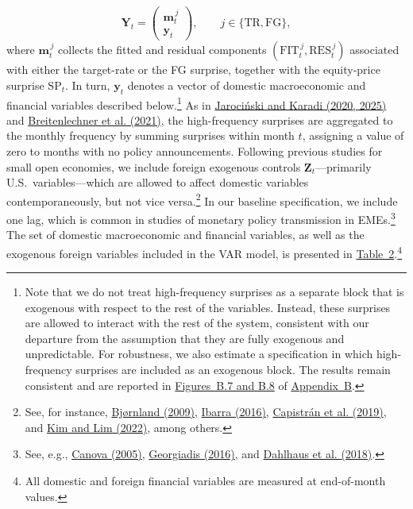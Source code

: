 \documentclass[12pt, reqno]{article}
\begin{document}
\[
\boldsymbol{Y}_t =
\begin{pmatrix}
\boldsymbol{m}_t^{\,j} \\
\boldsymbol{y}_t
\end{pmatrix},
\qquad j \in \{\text{TR}, \text{FG}\},
\]
where $\boldsymbol{m}_t^{\,j}$ collects the fitted and residual components $(\text{FIT}_t^{\,j}, \text{RES}_t^{\,j})$ associated with either the target-rate or the FG surprise, together with the equity-price surprise $\text{SP}_t$. In turn, $\boldsymbol{y}_t$ denotes a vector of domestic macroeconomic and financial variables described below.\footnote{Note that we do not treat high-frequency surprises as a separate block that is exogenous with respect to the rest of the variables. Instead, these surprises are allowed to interact with the rest of the system, consistent with our departure from the assumption that they are fully exogenous and unpredictable. For robustness, we also estimate a specification in which high-frequency surprises are included as an exogenous block. The results remain consistent and are reported in \hyperlink{Figure B.7}{Figures~B.7 and B.8} of \hyperlink{Appendix B}{Appendix~B}.} As in \hyperlink{JK (2020)}{Jarociński and Karadi (2020, 2025)} and \hyperlink{Breitenlechner (2021)}{Breitenlechner et al. (2021)}, the high-frequency surprises are aggregated to the monthly frequency by summing surprises within month $t$, assigning a value of zero to months with no policy announcements. Following previous studies for small open economies, we include foreign exogenous controls $\boldsymbol{Z}_t$—primarily U.S.\ variables—which are allowed to affect domestic variables contemporaneously, but not vice versa.\footnote{See, for instance, \hyperlink{Bjørnland (2009)}{Bjørnland (2009)}, \hyperlink{Ibarra (2016)}{Ibarra (2016)}, \hyperlink{Capistrán et al. (2019)}{Capistrán et al. (2019)}, and \hyperlink{Kim and Lim (2022)}{Kim and Lim (2022)}, among others.} In our baseline specification, we include one lag, which is common in studies of monetary policy transmission in EMEs.\footnote{See, e.g., \hyperlink{Canova (2005)}{Canova (2005)}, \hyperlink{Georgiadis (2016)}{Georgiadis (2016)}, and \hyperlink{Dahlhaus et al. (2018)}{Dahlhaus et al. (2018)}.} The set of domestic macroeconomic and financial variables, as well as the exogenous foreign variables included in the VAR model, is presented in \hyperlink{Table 3}{Table~2}.\footnote{All domestic and foreign financial variables are measured at end-of-month values.}
\end{document}
